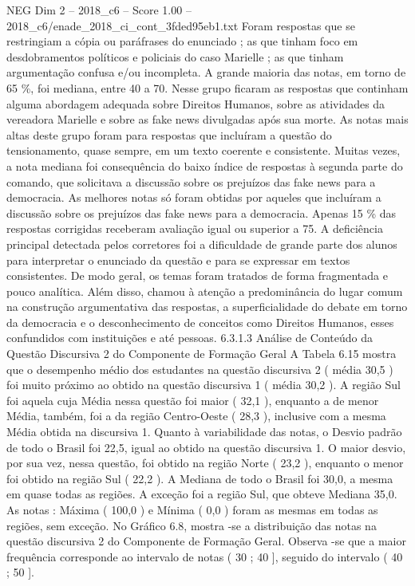 \begin{textsample}{NEG Dim 2 – 2018\_c6 – Score 1.00 – 2018\_c6/enade\_2018\_ci\_cont\_3fded95eb1.txt}
Foram respostas que se restringiam a cópia ou paráfrases do enunciado ; as que tinham foco em desdobramentos políticos e policiais do caso Marielle ; as que tinham argumentação confusa e/ou incompleta.
A grande maioria das notas, em torno de 65 \%, foi mediana, entre 40 a 70.
Nesse grupo ficaram as respostas que continham alguma abordagem adequada sobre Direitos Humanos, sobre as atividades da vereadora Marielle e sobre as fake news divulgadas após sua morte.
As notas mais altas deste grupo foram para respostas que incluíram a questão do tensionamento, quase sempre, em um texto coerente e consistente.
Muitas vezes, a nota mediana foi consequência do baixo índice de respostas à segunda parte do comando, que solicitava a discussão sobre os prejuízos das fake news para a democracia.
As melhores notas só foram obtidas por aqueles que incluíram a discussão sobre os prejuízos das fake news para a democracia.
Apenas 15 \% das respostas corrigidas receberam avaliação igual ou superior a 75.
A deficiência principal detectada pelos corretores foi a dificuldade de grande parte dos alunos para interpretar o enunciado da questão e para se expressar em textos consistentes.
De modo geral, os temas foram tratados de forma fragmentada e pouco analítica.
Além disso, chamou à atenção a predominância do lugar comum na construção argumentativa das respostas, a superficialidade do debate em torno da democracia e o desconhecimento de conceitos como Direitos Humanos, esses confundidos com instituições e até pessoas. 6.3.1.3 Análise de Conteúdo da Questão Discursiva 2 do Componente de Formação Geral A Tabela 6.15 mostra que o desempenho médio dos estudantes na questão discursiva 2 ( média 30,5 ) foi muito próximo ao obtido na questão discursiva 1 ( média 30,2 ).
A região Sul foi aquela cuja Média nessa questão foi maior ( 32,1 ), enquanto a de menor Média, também, foi a da região Centro-Oeste ( 28,3 ), inclusive com a mesma Média obtida na discursiva 1.
Quanto à variabilidade das notas, o Desvio padrão de todo o Brasil foi 22,5, igual ao obtido na questão discursiva 1.
O maior desvio, por sua vez, nessa questão, foi obtido na região Norte ( 23,2 ), enquanto o menor foi obtido na região Sul ( 22,2 ).
A Mediana de todo o Brasil foi 30,0, a mesma em quase todas as regiões.
A exceção foi a região Sul, que obteve Mediana 35,0.
As notas : Máxima ( 100,0 ) e Mínima ( 0,0 ) foram as mesmas em todas as regiões, sem exceção.
No Gráfico 6.8, mostra -se a distribuição das notas na questão discursiva 2 do Componente de Formação Geral.
Observa -se que a maior frequência corresponde ao intervalo de notas ( 30 ; 40 ], seguido do intervalo ( 40 ; 50 ].

\end{textsample}

